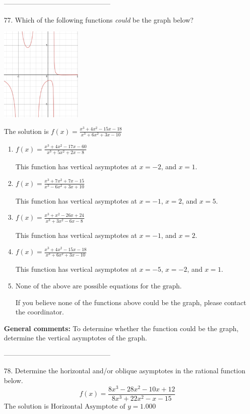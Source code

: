\documentclass{extbook}[14pt]
\begin{document}
-----------------------------------------------

77. Which of the following functions \textit{could} be the graph below?
\begin{center} \includegraphics[width=0.3\textwidth]{../Figures/identifyGraphOfRationalFunctionC.png} \end{center} 

The solution is $ f(x) = \frac{x^{3} +4 x^{2} -15 x -18}{x^{3} +6 x^{2} +3 x -10} $ 

\begin{enumerate}[label=\Alph*.] 
\item $ f(x) = \frac{x^{3} +4 x^{2} -17 x -60}{x^{3} +5 x^{2} +2 x -8} $ 

 This function has vertical asymptotes at $x=-2$, and $x=1$. 
\item $ f(x) = \frac{x^{3} +7 x^{2} +7 x -15}{x^{3} -6 x^{2} +3 x + 10} $ 

 This function has vertical asymptotes at $x=-1$, $x=2$, and $x=5$. 
\item $ f(x) = \frac{x^{3} + x^{2} -26 x + 24}{x^{3} +3 x^{2} -6 x -8} $ 

 This function has vertical asymptotes at $x=-1$, and $x=2$. 
\item $ f(x) = \frac{x^{3} +4 x^{2} -15 x -18}{x^{3} +6 x^{2} +3 x -10} $ 

 This function has vertical asymptotes at $x=-5$, $x=-2$, and $x=1$. 
\item $ \text{None of the above are possible equations for the graph.} $ 

 If you believe none of the functions above could be the graph, please contact the coordinator. 
\end{enumerate} 
 
\textbf{General comments:} To determine whether the function could be the graph, determine the vertical asymptotes of the graph.

-----------------------------------------------

78. Determine the horizontal and/or oblique asymptotes in the rational function below.
\[ f(x) = \frac{8x^{3} -28 x^{2} -10 x + 12}{8x^{3} +22 x^{2} -x -15} \] 
The solution is $ \text{Horizontal Asymptote of } y = 1.000  $ 
\end{document}
